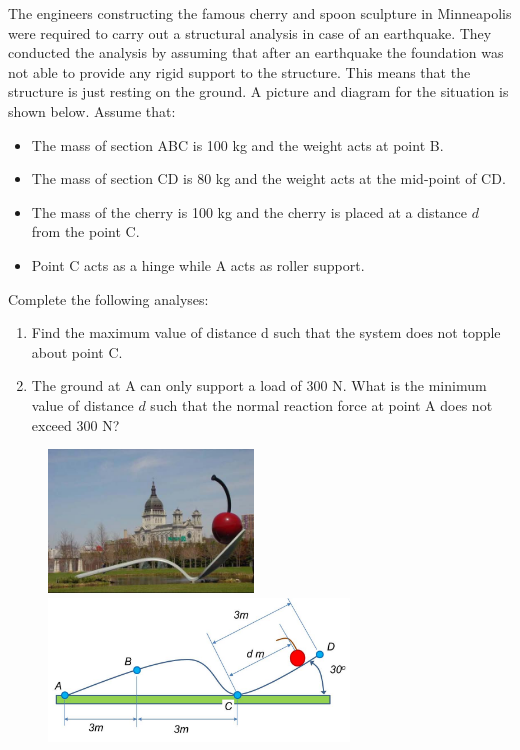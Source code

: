 

The engineers constructing the famous cherry and spoon sculpture in Minneapolis were required to carry out a
structural analysis in case of an earthquake. They conducted the analysis by assuming that after an earthquake
the foundation was not able to provide any rigid support to the structure. This means that the structure is
just resting on the ground. A picture and diagram for the situation is shown below. Assume that:
\begin{itemize}
  \item The mass of section ABC is 100 kg and the weight acts at point B.
  \item The mass of section CD is 80 kg and the weight acts at the mid-point of CD.
  \item The mass of the cherry is 100 kg and the cherry is placed at a distance $d$ from the point C.
  \item Point C acts as a hinge while A acts as roller support.
\end{itemize}
Complete the following analyses:
\begin{enumerate}
  \item Find the maximum value of distance d such that the system does not topple about point C.
  \item The ground at A can only support a load of 300 N. What is the minimum value of distance $d$ such that
the normal reaction force at point A does not exceed 300 N?
\end{enumerate}

\begin{figure}[ht!]
  \centering
  \includegraphics[height=1.5in]{figa.png}
  \includegraphics[height=1.5in]{figb.png}
\end{figure}

